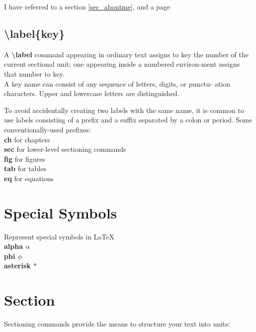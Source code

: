 \documentclass[12pt]{article}
\begin{document}
I have referred to a section \ref{sec_aboutme}, and a page \pageref{sec_aboutme}

\subsection{\textbackslash label\{key\}}
A \textbf{\textbackslash label} command appearing in ordinary text assigns to key the number of the
current sectional unit; one appearing inside a numbered environ-ment assigns
that number to key.\\

\indent\indent
A key name can consist of any sequence of letters, digits, or punctu-
ation characters. Upper and lowercase letters are distinguished.

To avoid accidentally creating two labels with the same name, it is common
to use labels consisting of a prefix and a suffix separated by a colon or period.
Some conventionally-used prefixes:\\

\noindent
\textbf{ch} \hspace{0.5cm} for chapters\\
\textbf{sec} \hspace{0.5cm} for lower-level sectioning commands\\
\textbf{fig} \hspace{0.5cm} for figures\\
\textbf{tab} \hspace{0.5cm} for tables\\
\textbf{eq} \hspace{0.5cm} for equations\\

\section{Special Symbols}\label{sec_specsym}
Represent special symbols in \LaTeX\ \\

\noindent
\textbf{alpha \hspace{1cm} $\alpha$}\\
\textbf{phi \hspace{1cm} $\phi$}\\
\textbf{asterisk \hspace{0.8cm} $*$}\\
\newpage

\section{Section}\label{sec_section}
Sectioning commands provide the means to structure your text into units:
\end{document}
